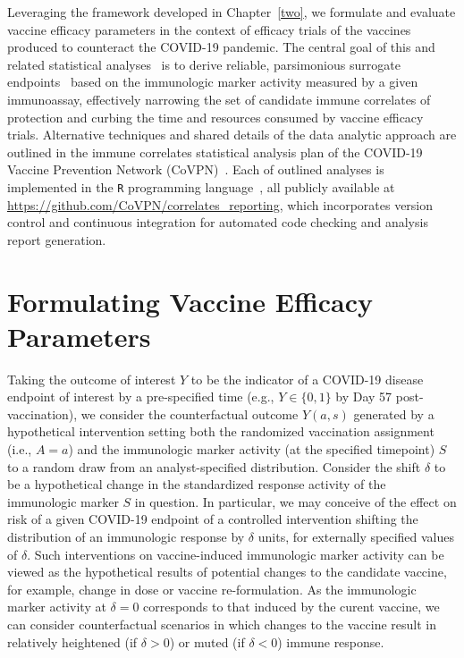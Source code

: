 Leveraging the framework developed in Chapter~\ref{two}, we formulate and
evaluate vaccine efficacy parameters in the context of efficacy trials of the
vaccines produced to counteract the COVID-19 pandemic. The central goal of this
and related statistical analyses~\citep[e.g.,][]{benkeser2021inference,
gilbert2021assessment} is to derive reliable, parsimonious surrogate
endpoints~\citep{prentice1989surrogate, gilbert2008evaluating} based on the
immunologic marker activity measured by a given immunoassay, effectively
narrowing the set of candidate immune correlates of protection and curbing the
time and resources consumed by vaccine efficacy trials. Alternative techniques
and shared details of the data analytic approach are outlined in the immune
correlates statistical analysis plan of the COVID-19 Vaccine Prevention Network
(CoVPN)~\citep{gilbert2021covpn}. Each of outlined analyses is implemented in
the \texttt{R} programming language~\citep{R}, all publicly available at
\url{https://github.com/CoVPN/correlates_reporting}, which incorporates version
control and continuous integration for automated code checking and analysis
report generation.

\section{Formulating Vaccine Efficacy Parameters}

Taking the outcome of interest $Y$ to be the indicator of a COVID-19 disease
endpoint of interest by a pre-specified time (e.g., $Y \in \{0, 1\}$ by Day 57
post-vaccination), we consider the counterfactual outcome $Y(a,s)$ generated by
a hypothetical intervention setting both the randomized vaccination assignment
(i.e., $A = a$) and the immunologic marker activity (at the specified timepoint)
$S$ to a random draw from an analyst-specified distribution. Consider the shift
$\delta$ to be a hypothetical change in the standardized response activity of
the immunologic marker $S$ in question. In particular, we may conceive of the
effect on risk of a given COVID-19 endpoint of a controlled intervention
shifting the distribution of an immunologic response by $\delta$ units, for
externally specified values of $\delta$. Such interventions on vaccine-induced
immunologic marker activity can be viewed as the hypothetical results of
potential changes to the candidate vaccine, for example, change in dose or
vaccine re-formulation. As the immunologic marker activity at $\delta = 0$
corresponds to that induced by the curent vaccine, we can consider
counterfactual scenarios in which changes to the vaccine result in relatively
heightened (if $\delta > 0$) or muted (if $\delta < 0$) immune response.

